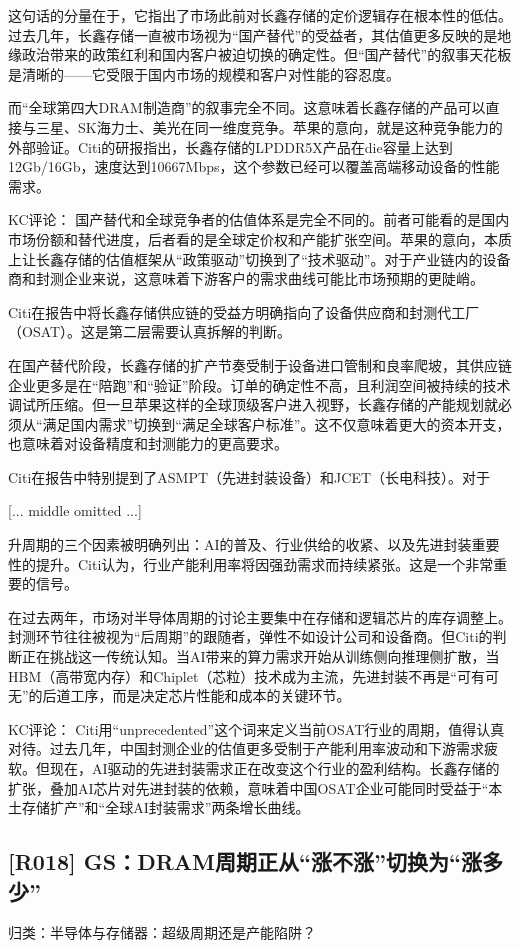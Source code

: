 \documentclass[11pt]{ctexart}
\begin{document}
这句话的分量在于，它指出了市场此前对长鑫存储的定价逻辑存在根本性的低估。过去几年，长鑫存储一直被市场视为“国产替代”的受益者，其估值更多反映的是地缘政治带来的政策红利和国内客户被迫切换的确定性。但“国产替代”的叙事天花板是清晰的——它受限于国内市场的规模和客户对性能的容忍度。

而“全球第四大DRAM制造商”的叙事完全不同。这意味着长鑫存储的产品可以直接与三星、SK海力士、美光在同一维度竞争。苹果的意向，就是这种竞争能力的外部验证。Citi的研报指出，长鑫存储的LPDDR5X产品在die容量上达到12Gb/16Gb，速度达到10667Mbps，这个参数已经可以覆盖高端移动设备的性能需求。

KC评论： 国产替代和全球竞争者的估值体系是完全不同的。前者可能看的是国内市场份额和替代进度，后者看的是全球定价权和产能扩张空间。苹果的意向，本质上让长鑫存储的估值框架从“政策驱动”切换到了“技术驱动”。对于产业链内的设备商和封测企业来说，这意味着下游客户的需求曲线可能比市场预期的更陡峭。

Citi在报告中将长鑫存储供应链的受益方明确指向了设备供应商和封测代工厂（OSAT）。这是第二层需要认真拆解的判断。

在国产替代阶段，长鑫存储的扩产节奏受制于设备进口管制和良率爬坡，其供应链企业更多是在“陪跑”和“验证”阶段。订单的确定性不高，且利润空间被持续的技术调试所压缩。但一旦苹果这样的全球顶级客户进入视野，长鑫存储的产能规划就必须从“满足国内需求”切换到“满足全球客户标准”。这不仅意味着更大的资本开支，也意味着对设备精度和封测能力的更高要求。

Citi在报告中特别提到了ASMPT（先进封装设备）和JCET（长电科技）。对于

[... middle omitted ...]

升周期的三个因素被明确列出：AI的普及、行业供给的收紧、以及先进封装重要性的提升。Citi认为，行业产能利用率将因强劲需求而持续紧张。这是一个非常重要的信号。

在过去两年，市场对半导体周期的讨论主要集中在存储和逻辑芯片的库存调整上。封测环节往往被视为“后周期”的跟随者，弹性不如设计公司和设备商。但Citi的判断正在挑战这一传统认知。当AI带来的算力需求开始从训练侧向推理侧扩散，当HBM（高带宽内存）和Chiplet（芯粒）技术成为主流，先进封装不再是“可有可无”的后道工序，而是决定芯片性能和成本的关键环节。

KC评论： Citi用“unprecedented”这个词来定义当前OSAT行业的周期，值得认真对待。过去几年，中国封测企业的估值更多受制于产能利用率波动和下游需求疲软。但现在，AI驱动的先进封装需求正在改变这个行业的盈利结构。长鑫存储的扩张，叠加AI芯片对先进封装的依赖，意味着中国OSAT企业可能同时受益于“本土存储扩产”和“全球AI封装需求”两条增长曲线。

\subsection{[R018] GS：DRAM周期正从“涨不涨”切换为“涨多少”}
{\small\color{refgray}归类：半导体与存储器：超级周期还是产能陷阱？}
\end{document}
